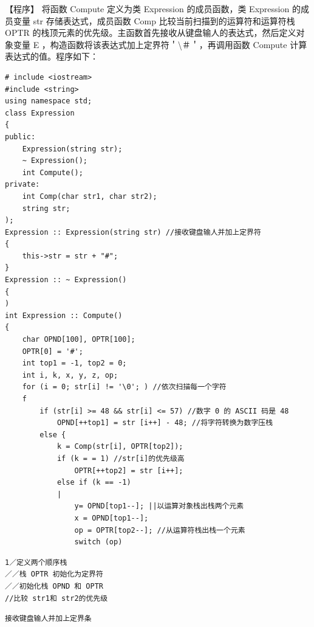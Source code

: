 \documentclass[10pt]{article}
\begin{document}
【程序】 将函数 Compute 定义为类 Expression 的成员函数，类 Expression 的成员变量 str 存储表达式，成员函数 Comp 比较当前扫描到的运算符和运算符栈 OPTR 的栈顶元素的优先级。主函数首先接收从键盘输人的表达式，然后定义对象变量 E ，构造函数将该表达式加上定界符＇\textbackslash ＃＇，再调用函数 Compute 计算表达式的值。程序如下：

\begin{verbatim}
# include <iostream>
#include <string>
using namespace std;
class Expression
{
public:
    Expression(string str);
    ~ Expression();
    int Compute();
private:
    int Comp(char str1, char str2);
    string str;
);
Expression :: Expression(string str) //接收键盘输人并加上定界符
{
    this->str = str + "#";
}
Expression :: ~ Expression()
{
)
int Expression :: Compute()
{
    char OPND[100], OPTR[100];
    OPTR[0] = '#';
    int top1 = -1, top2 = 0;
    int i, k, x, y, z, op;
    for (i = 0; str[i] != '\0'; ) //依次扫描每一个字符
    f
        if (str[i] >= 48 && str[i] <= 57) //数字 0 的 ASCII 码是 48
            OPND[++top1] = str [i++] - 48; //将字符转换为数字压栈
        else {
            k = Comp(str[i], OPTR[top2]);
            if (k = = 1) //str[i]的优先级高
                OPTR[++top2] = str [i++];
            else if (k == -1)
            |
                y= OPND[top1--]; ||以运算对象栈出栈两个元素
                x = OPND[top1--];
                op = OPTR[top2--]; //从运算符栈出栈一个元素
                switch (op)
\end{verbatim}

\begin{verbatim}
1／定义两个顺序栈
／／栈 OPTR 初始化为定界符
／／初始化栈 OPND 和 OPTR
//比较 str1和 str2的优先级
\end{verbatim}

\begin{verbatim}
接收键盘输人并加上定界条
\end{verbatim}
\end{document}
